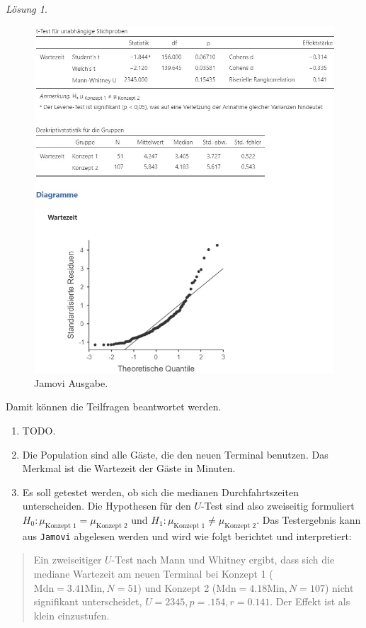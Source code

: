 \documentclass[
]{book}
\providecommand{\tightlist}{%
  \setlength{\itemsep}{0pt}\setlength{\parskip}{0pt}}
\theoremstyle{definition}
\theoremstyle{definition}
\theoremstyle{definition}
\theoremstyle{definition}
\theoremstyle{remark}
\newtheorem*{solution}{Lösung}
\begin{document}
\begin{solution}
\begin{figure}
\includegraphics[width=1\linewidth]{figures/07-exr-warteschlangen-jmv-output} \caption{Jamovi Ausgabe.}\label{fig:sol-warteschlangen-output}
\end{figure}

Damit können die Teilfragen beantwortet werden.

\begin{enumerate}
\def\labelenumi{\alph{enumi})}
\tightlist
\item
  TODO.
\item
  Die Population sind alle Gäste, die den neuen Terminal benutzen. Das Merkmal ist die Wartezeit der Gäste in Minuten.
\item
  Es soll getestet werden, ob sich die medianen Durchfahrtszeiten unterscheiden. Die Hypothesen für den \(U\)-Test sind also zweiseitig formuliert \(H_0: \mu_\text{Konzept 1} = \mu_\text{Konzept 2}\) und \(H_1: \mu_\text{Konzept 1} \neq \mu_\text{Konzept 2}\). Das Testergebnis kann aus \texttt{Jamovi} abgelesen werden und wird wie folgt berichtet und interpretiert:
\end{enumerate}

\begin{quote}
Ein zweiseitiger \(U\)-Test nach Mann und Whitney ergibt, dass sich die mediane Wartezeit am neuen Terminal bei Konzept 1 (\(\text{Mdn}= 3.41 \text{Min}, N =51\)) und Konzept 2 (\(\text{Mdn}=4.18 \text{Min}, N = 107\)) nicht signifikant unterscheidet, \(U = 2345, p = .154, r = 0.141\). Der Effekt ist als klein einzustufen.
\end{quote}

\end{solution}
\end{document}
